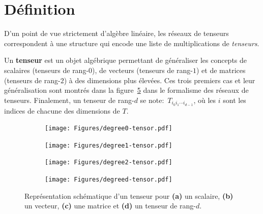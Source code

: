 \section{Définition}\label{sec:tn-definition}
D'un point de vue strictement d'algèbre linéaire, les réseaux de tenseurs correspondent à une structure qui encode une liste de multiplications de \emph{tenseurs}.
\begin{definition}\label{def:tensor}
    Un \textbf{tenseur} est un objet algébrique permettant de généraliser les concepts de scalaires (tenseurs de rang-$0$), de vecteurs (tenseurs de rang-$1$) et de matrices (tenseurs de rang-$2$) à des dimensions plus élevées.
    Ces trois premiers cas et leur généralisation sont montrés dans la figure~\ref{fig:tensor-schematic-def} dans le formalisme des réseaux de tenseurs.
    Finalement, un tenseur de rang-$d$ se note:~$T_{i_0 i_1 \cdots i_{d-1}}$, où les $i$ sont les indices de chacune des dimensions de $T$.
    \begin{figure}[h]
        \centering
        \begin{subfigure}{.24\textwidth}
            \centering
            \texttt{[image: Figures/degree0-tensor.pdf]}
            \caption{}
            \label{fig:tensor-scalar}
        \end{subfigure}
        \begin{subfigure}{.24\textwidth}%
            \centering
            \texttt{[image: Figures/degree1-tensor.pdf]}
            \caption{}
            \label{fig:tensor-vector}
        \end{subfigure}
        \begin{subfigure}{.24\textwidth}%
            \centering
            \texttt{[image: Figures/degree2-tensor.pdf]}
            \caption{}
            \label{fig:tensor-matrix}
        \end{subfigure}
        \begin{subfigure}{.24\textwidth}%
            \centering
            \texttt{[image: Figures/degreed-tensor.pdf]}
            \caption{}
            \label{fig:tensor-tensor}
        \end{subfigure}
        \caption{Représentation schématique d'un tenseur pour \textbf{(a)} un scalaire, \textbf{(b)} un vecteur, \textbf{(c)} une matrice et \textbf{(d)} un tenseur de rang-$d$.}
        \label{fig:tensor-schematic-def}
    \end{figure}
\end{definition}

